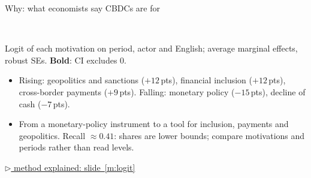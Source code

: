 \documentclass[aspectratio=169,10pt]{beamer}
\newcommand{\method}[1]{\hfill\hyperref[#1]{\tiny\textcolor{c4}{$\triangleright$ method explained: slide~\ref*{#1}}}}
\begin{document}
\begin{frame}{Why: what economists say CBDCs are for}
\begin{tabular}{@{}p{}rrrrr@{}}
\bottomrule\end{tabular}\\[3pt]
Logit of each motivation on period, actor and English; average marginal effects, robust SEs. \textbf{Bold}: CI excludes 0.
\begin{itemize}\setlength\itemsep{0pt}
\item \alert{Rising:} geopolitics and sanctions ($+12$\,pts), financial inclusion ($+12$\,pts), cross-border payments ($+9$\,pts). \quad \alert{Falling:} monetary policy ($-15$\,pts), decline of cash ($-7$\,pts).
\item From a \alert{monetary-policy instrument} to a tool for \alert{inclusion, payments and geopolitics}. Recall $\approx 0.41$: shares are \alert{lower bounds}; compare motivations and periods rather than read levels.
\end{itemize}
\method{m:logit}
\end{frame}
\end{document}
